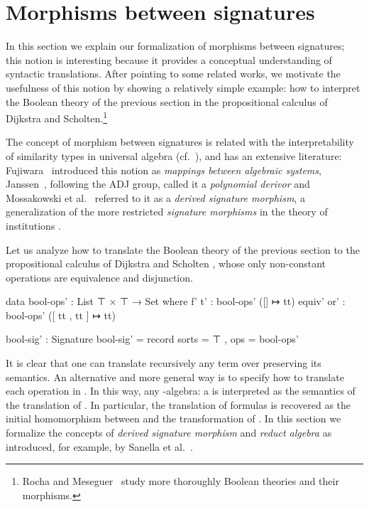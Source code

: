 \section{Morphisms between signatures}
\label{sec:trans}
In this section we explain our formalization of morphisms between
signatures; this notion is interesting because it provides a
conceptual understanding of syntactic translations. After pointing to
some related works, we motivate the usefulness of this notion by
showing a relatively simple example: how to interpret the Boolean
theory of the previous section in the propositional calculus of
Dijkstra and Scholten.\footnote{Rocha and Meseguer~\cite{rocha-2007}
  study more thoroughly Boolean theories and their morphisms.}

The concept of morphism between signatures is related with the
interpretability of similarity types in universal algebra
(cf.~\cite{garcia-84}), and has an extensive literature:
Fujiwara~\cite{fujiwara-1959} introduced this notion as
\textit{mappings between algebraic systems},
Janssen~\cite{janssen-98}, following the ADJ group, called it a
\textit{polynomial derivor} and Mossakowski et al.~\cite{mossakowski-15}
referred to it as a \textit{derived signature morphism}, a generalization
of the more restricted \textit{signature morphisms} in the theory of
institutions \cite{goguen-92}.

Let us analyze how to translate the Boolean theory of the previous
section to the propositional calculus of Dijkstra and Scholten
\cite{dijkstra-scholten}, whose only non-constant operations are
equivalence and disjunction.
\begin{spec}
data bool-ops' : List ⊤ × ⊤ → Set where
  f' t'    : bool-ops' ([] ↦ tt)
  equiv' or' : bool-ops' ([ tt , tt ] ↦ tt)

bool-sig' : Signature
bool-sig' = record { sorts = ⊤ , ops = bool-ops' }
\end{spec}
It is clear that one can translate recursively any term over
 preserving its
semantics. %
An alternative and more general way is to specify how to translate
each operation in . In this way,
any -algebra: a
 is interpreted as the semantics of the
translation of . In particular, the translation of formulas is
recovered as the initial homomorphism between  and the
transformation of . In this section we formalize the
concepts of \emph{derived signature morphism} and \emph{reduct
  algebra} as introduced, for example, by Sanella et al.~\cite{sannella2012foundations}.

